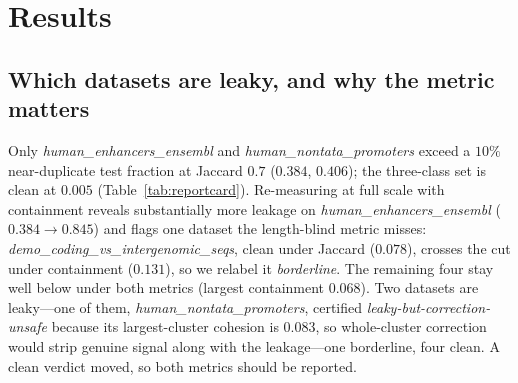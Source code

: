 \documentclass[webpdf,modern,large,namedate]{oup-authoring-template}%
\begin{document}
\section{Results}\label{sec:results}

\subsection{Which datasets are leaky, and why the metric matters}\label{sec:r-card}
Only \textit{human\_enhancers\_ensembl} and \textit{human\_nontata\_promoters} exceed a $10\%$ near-duplicate test fraction at Jaccard $0.7$ ($0.384$, $0.406$); the three-class set is clean at $0.005$ (Table~\ref{tab:reportcard}). Re-measuring at full scale with containment reveals substantially more leakage on \textit{human\_enhancers\_ensembl} ($0.384\to0.845$) and flags one dataset the length-blind metric misses: \textit{demo\_coding\_vs\_intergenomic\_seqs}, clean under Jaccard ($0.078$), crosses the cut under containment ($0.131$), so we relabel it \emph{borderline}. The remaining four stay well below under both metrics (largest containment $0.068$). Two datasets are leaky---one of them, \textit{human\_nontata\_promoters}, certified \emph{leaky-but-correction-unsafe} because its largest-cluster cohesion is $0.083$, so whole-cluster correction would strip genuine signal along with the leakage---one borderline, four clean. A clean verdict moved, so both metrics should be reported.
\end{document}
